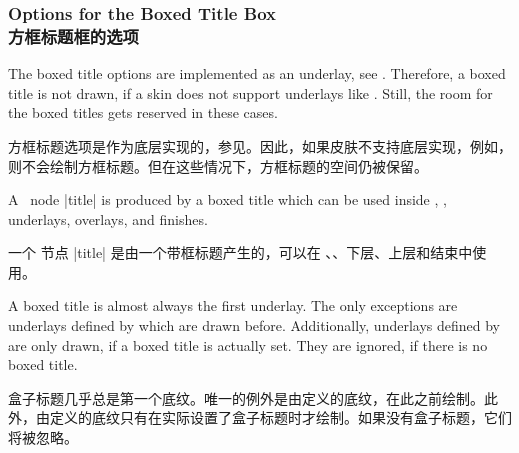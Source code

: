 \subsubsection{Options for the Boxed Title Box\\方框标题框的选项}

\begin{marker}
The boxed title options are implemented as an underlay, see .
Therefore, a boxed title is not drawn, if a skin does not support underlays
like . Still, the room for the boxed
titles gets reserved in these cases.

方框标题选项是作为底层实现的，参见。因此，如果皮肤不支持底层实现，例如，则不会绘制方框标题。但在这些情况下，方框标题的空间仍被保留。
\end{marker}

\begin{marker}
A \tikzname\ node |title| is produced by a boxed title which can be used
inside , ,
underlays, overlays, and finishes.

一个 \tikzname 节点 |title| 是由一个带框标题产生的，可以在 、、下层、上层和结束中使用。
\end{marker}

\begin{marker}
A boxed title is almost always the first underlay. The only exceptions are
underlays defined by  which are drawn
before. Additionally, underlays defined by 
are only drawn, if a boxed title is actually set. They are ignored, if
there is no boxed title.

盒子标题几乎总是第一个底纹。唯一的例外是由定义的底纹，在此之前绘制。此外，由定义的底纹只有在实际设置了盒子标题时才绘制。如果没有盒子标题，它们将被忽略。
\end{marker}



